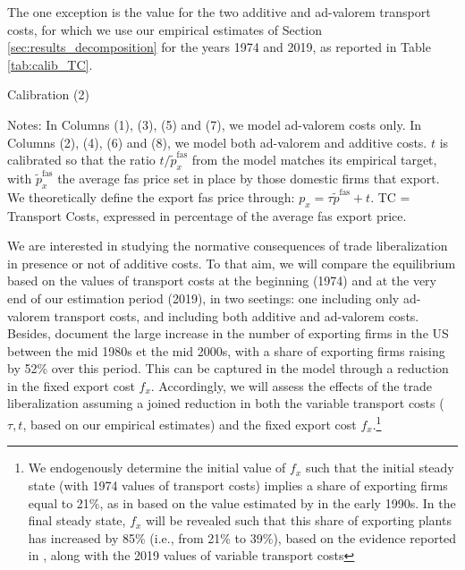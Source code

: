 \documentclass[a4paper,11pt]{article}
\begin{document}
The one exception is the value for the two additive and ad-valorem transport costs, for which we use our empirical estimates of Section \ref{sec:results_decomposition} for the years 1974 and 2019, as reported in Table \ref{tab:calib_TC}.

\begin{table}[htb]
  \centering
  \caption{Calibration (2)}\label{tab:calib_TC}
\begin{center}
	
\end{center}
{\parbox[l]{13cm}{ \vspace{4pt}\footnotesize{Notes: In Columns (1), (3), (5) and (7), we model ad-valorem costs only. In Columns (2), (4), (6) and (8), we model both ad-valorem and additive costs. $t$ is calibrated so that the ratio $t/\widetilde{p}^{\text{fas}}_x$ from the model matches its empirical target, with $\widetilde{p}^{\text{fas}}_x$ the average fas price set in place by those domestic firms that export. We theoretically define the export fas price through: $p_x = \tau \widetilde{p}^{\text{fas}} +t$. TC = Transport Costs, expressed in percentage of the average fas export price.}}}
\end{table}

We are interested in studying the normative consequences of trade liberalization in presence or not of additive costs. To that aim, we will compare the equilibrium based on the values of transport costs at the beginning (1974) and at the very end of our estimation period (2019), in two seetings: one including only ad-valorem transport costs, and including both additive and ad-valorem costs. Besides, \cite{Lincoln_McCallum2018} document the large increase in the number of exporting firms in the US between the mid 1980s et the mid 2000s, with a share of exporting firms raising by 52\% over this period. This can be captured in the model through a reduction in the fixed export cost $f_x$. Accordingly, we will assess the effects of the trade liberalization assuming a joined reduction in both the variable transport costs ($\tau, t$, based on our empirical estimates) and the fixed export cost $f_x$.\footnote{We endogenously determine the initial value of $f_x$ such that the initial steady state (with 1974 values of transport costs) implies a share of exporting firms equal to 21\%, as in  \cite{ghironi} based on the value estimated by \cite{BEJK-AER-03} in the early 1990s. In the final steady state, $f_x$ will be revealed such that this share of exporting plants has increased by 85\% (i.e., from 21\% to 39\%), based on the evidence reported in \cite{Lincoln_McCallum2018}, along with the 2019 values of variable transport costs}
\end{document}
